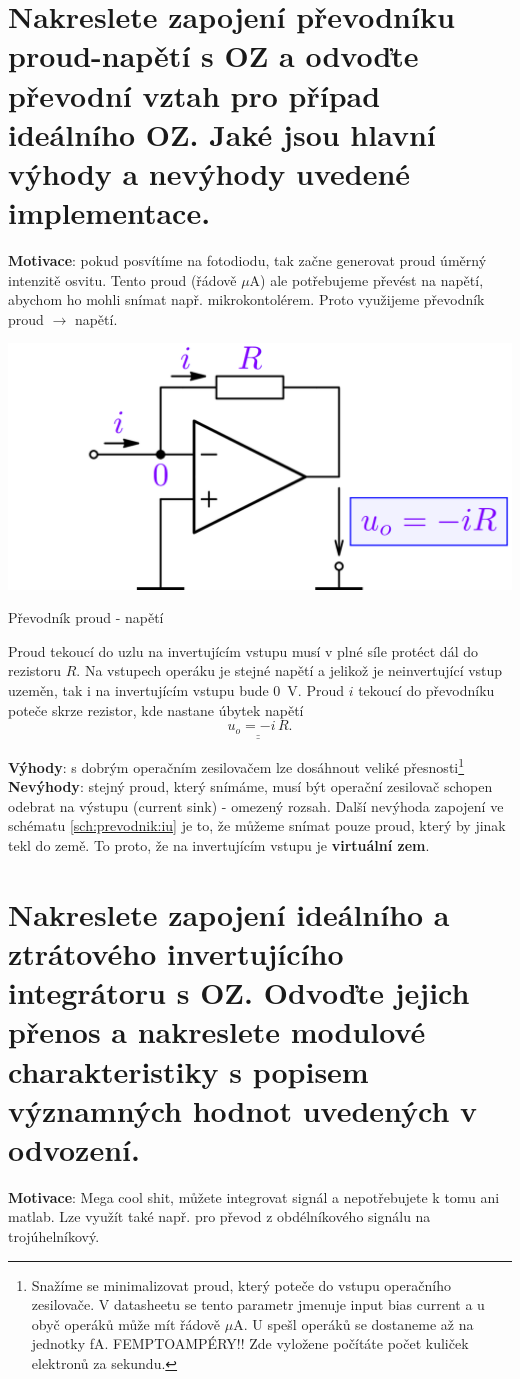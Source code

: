 \documentclass[a4paper,12pt]{article}   %
\begin{document}
\section{Nakreslete zapojení převodníku proud-napětí s OZ a odvoďte převodní vztah pro případ ideálního OZ. Jaké jsou hlavní výhody a nevýhody uvedené implementace.}
\textbf{Motivace}: pokud posvítíme na fotodiodu, tak začne generovat proud úměrný intenzitě osvitu. Tento proud (řádově $\mu$A) ale potřebujeme převést na napětí, abychom ho mohli snímat např. mikrokontolérem. Proto využijeme převodník proud $\rightarrow$ napětí.

\begin{schema}
    \centering
    \includegraphics[width=.4\textwidth]{prevodnik-iu.PNG}
    \caption{Převodník proud - napětí}
    \label{sch:prevodnik:iu}
\end{schema}

Proud tekoucí do uzlu na invertujícím vstupu musí v plné síle protéct dál do rezistoru $R$. Na vstupech operáku je stejné napětí a jelikož je neinvertující vstup uzeměn, tak i na invertujícím vstupu bude $0$~V. Proud $i$ tekoucí do převodníku poteče skrze rezistor, kde nastane úbytek napětí
\begin{equation}
    \underline{\underline{u_o = -i\,R}}.
\end{equation}

\textbf{Výhody}: s dobrým operačním zesilovačem lze dosáhnout veliké přesnosti\footnote{Snažíme se minimalizovat proud, který poteče do vstupu operačního zesilovače. V datasheetu se tento parametr jmenuje input bias current a u obyč operáků může mít řádově $\mu$A. U spešl operáků se dostaneme až na jednotky fA. FEMPTOAMPÉRY!! Zde vyložene počítáte počet kuliček elektronů za sekundu.}\\
\textbf{Nevýhody}: stejný proud, který snímáme, musí být operační zesilovač schopen odebrat na výstupu (current sink) - omezený rozsah. Další nevýhoda zapojení ve schématu \ref{sch:prevodnik:iu} je to, že můžeme snímat pouze proud, který by jinak tekl do země. To proto, že na invertujícím vstupu je \textbf{virtuální zem}.






\section{Nakreslete zapojení ideálního a ztrátového invertujícího integrátoru s OZ. Odvoďte jejich přenos a nakreslete modulové charakteristiky s popisem významných hodnot uvedených v odvození.}
\label{chap:integrator}
\textbf{Motivace}: Mega cool shit, můžete integrovat signál a nepotřebujete k tomu ani matlab. Lze využít také např. pro převod z obdélníkového signálu na trojúhelníkový. 
\end{document}
